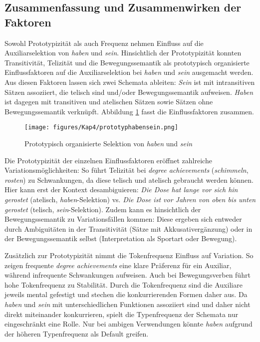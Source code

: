\subsection{Zusammenfassung und Zusammenwirken der Faktoren} 
\label{protozus}

Sowohl Prototypizität als auch Frequenz nehmen Einfluss auf die Auxiliarselektion von \textit{haben} und \textit{sein}. Hinsichtlich der Prototypizität konnten Transitivität, Telizität und die Bewegungssemantik als prototypisch organisierte Einflussfaktoren auf die Auxiliarselektion bei \textit{haben} und \textit{sein} ausgemacht werden. Aus diesen Faktoren lassen sich zwei Schemata ableiten: \textit{Sein} ist mit intransitiven Sätzen assoziiert, die telisch sind und/oder Bewegungssemantik aufweisen. \textit{Haben} ist dagegen mit transitiven und atelischen Sätzen sowie Sätzen ohne Bewegungssemantik verknüpft. Abbildung \ref{fig4protverb} fasst die Einflussfaktoren zusammen. 

\begin{figure}
\texttt{[image: figures/Kap4/prototyphabensein.png]}  
\caption{Prototypisch organisierte Selektion von \textit{haben} und \textit{sein}}
\label{fig4protverb}
\end{figure}

Die Prototypizität der einzelnen Einflussfaktoren eröffnet zahlreiche Variationsmöglichkeiten: So führt Telizität bei \textit{degree achievements} (\textit{schimmeln}, \textit{rosten}) zu Schwankungen, da diese telisch und atelisch gebraucht werden können. Hier kann erst der Kontext desambiguieren: \textit{Die Dose hat lange vor sich hin gerostet} (atelisch, \textit{haben}-Selektion) vs. \textit{Die Dose ist vor Jahren von oben bis unten gerostet} (telisch, \textit{sein}-Selektion). Zudem kann es hinsichtlich der Bewegungssemantik zu Variationsfällen kommen: Diese ergeben sich entweder durch Ambiguitäten in der Transitivität (Sätze mit Akkusativergänzung) oder in der Bewegungssemantik selbst (Interpretation als Sportart oder Bewegung).  



Zusätzlich zur Prototypizität nimmt die Tokenfrequenz Einfluss auf Variation. So zeigen frequente \textit{degree achievements} eine klare Präferenz für ein Auxiliar, während infrequente Schwankungen aufweisen. Auch bei Bewegungsverben führt hohe Tokenfrequenz zu Stabilität. Durch die Tokenfrequenz sind die Auxiliare jeweils mental gefestigt und stechen die konkurrierenden Formen daher aus. Da \textit{haben} und \textit{sein} mit unterschiedlichen Funktionen assoziiert sind und daher nicht direkt miteinander konkurrieren, spielt die Typenfrequenz der Schemata nur eingeschränkt eine Rolle. Nur bei ambigen Verwendungen könnte \textit{haben} aufgrund der höheren Typenfrequenz als Default greifen.  

